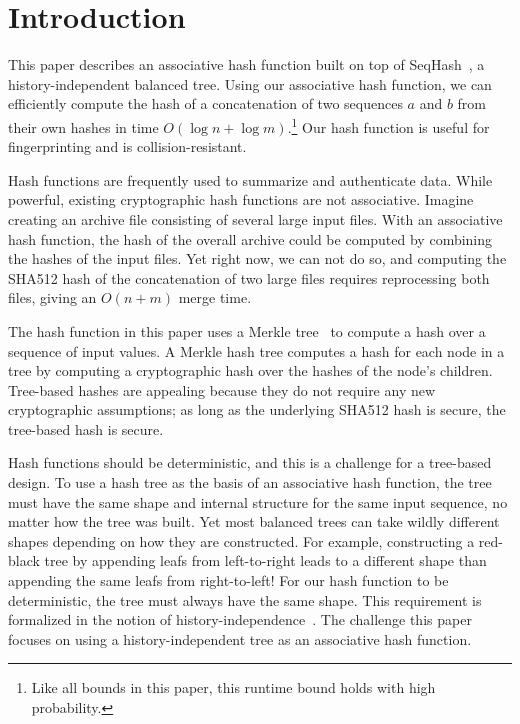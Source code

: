 \section{Introduction}

This paper describes an associative hash function built on top of
SeqHash~\cite{versum:ccs14}, a history-independent balanced tree. Using our
associative hash function, we can efficiently compute the hash of a
concatenation of two sequences $a$ and $b$ from their own hashes in time
$O(\log n + \log m)$.\footnote{Like all bounds in this paper, this runtime
bound holds with high probability.} Our hash function is useful for
fingerprinting and is collision-resistant.

Hash functions are frequently used to summarize and authenticate data. While
powerful, existing cryptographic hash functions are not associative. Imagine
creating an archive file consisting of several large input files. With an
associative hash function, the hash of the overall archive could be computed by
combining the hashes of the input files. Yet right now, we can not do so, and
computing the SHA512 hash of the concatenation of two large files requires
reprocessing both files, giving an $O(n + m)$ merge time.

The hash function in this paper uses a Merkle
tree~\cite{merkle:sig-conventional} to compute a hash over a sequence of input
values. A Merkle hash tree computes a hash for each node in a tree by computing
a cryptographic hash over the hashes of the node's children. Tree-based hashes
are appealing because they do not require any new cryptographic assumptions; as
long as the underlying SHA512 hash is secure, the tree-based hash is secure. 

Hash functions should be deterministic, and this is a challenge for a
tree-based design. To use a hash tree as the basis of an associative hash
function, the tree must have the same shape and internal structure for the same
input sequence, no matter how the tree was built. Yet most balanced trees can
take wildly different shapes depending on how they are constructed. For
example, constructing a red-black tree by appending leafs from left-to-right
leads to a different shape than appending the same leafs from right-to-left!
For our hash function to be deterministic, the tree must always have the same
shape.  This requirement is formalized in the notion of
history-independence~\cite{naor:hids}. The challenge this paper focuses on
using a history-independent tree as an associative hash function. 

